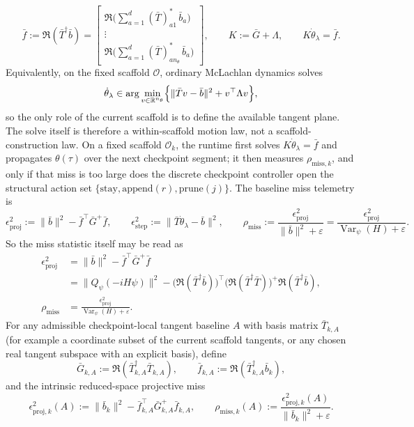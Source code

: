 \documentclass[11pt]{article}
\begin{document}
\[
\bar f
:=
\Re(\bar T^\dagger\bar b)
=
\left[
\begin{array}{c}
\Re\!\bigl(\sum_{a=1}^{d}(\bar T)_{a1}^*\,\bar b_a\bigr)\\
\vdots\\
\Re\!\bigl(\sum_{a=1}^{d}(\bar T)_{a n_\theta}^*\,\bar b_a\bigr)
\end{array}
\right],
\qquad
K:=\bar G+\Lambda,
\qquad
K\dot\theta_\lambda=\bar f.
\]
Equivalently, on the fixed scaffold \(\mathcal O\), ordinary McLachlan dynamics solves
\[
\dot\theta_\lambda\in\arg\min_{v\in\mathbb R^{n_\theta}}
\Bigl\{
\|\bar T v-\bar b\|^2+v^\top\Lambda v
\Bigr\},
\]
so the only role of the current scaffold is to define the available tangent plane. The solve itself is therefore a within-scaffold motion law, not a scaffold-construction law.
On a fixed scaffold \(\mathcal O_k\), the runtime first solves \(K\dot\theta_\lambda=\bar f\) and propagates \(\theta(\tau)\) over the next checkpoint segment; it then measures \(\rho_{\mathrm{miss},k}\), and only if that miss is too large does the discrete checkpoint controller open the structural action set \(\{\mathrm{stay},\mathrm{append}(r),\mathrm{prune}(j)\}\).
The baseline miss telemetry is
\[
\epsilon_{\mathrm{proj}}^2:=\|\bar b\|^2-\bar f^\top\bar G^+\bar f,
\qquad
\epsilon_{\mathrm{step}}^2:=\|\bar T\dot\theta_\lambda-\bar b\|^2,
\qquad
\rho_{\mathrm{miss}}:=\frac{\epsilon_{\mathrm{proj}}^2}{\|\bar b\|^2+\varepsilon}
=\frac{\epsilon_{\mathrm{proj}}^2}{\operatorname{Var}_\psi(H)+\varepsilon}.
\]
So the miss statistic itself may be read as
\[
\begin{aligned}
\epsilon_{\mathrm{proj}}^2
&=
\|\bar b\|^2-\bar f^\top\bar G^+\bar f\\
&=
\|Q_\psi(-iH\psi)\|^2
-
\bigl(\Re(\bar T^\dagger\bar b)\bigr)^\top
\bigl(\Re(\bar T^\dagger\bar T)\bigr)^+
\Re(\bar T^\dagger\bar b),\\
\rho_{\mathrm{miss}}
&=
\frac{\epsilon_{\mathrm{proj}}^2}{\operatorname{Var}_\psi(H)+\varepsilon}.
\end{aligned}
\]
For any admissible checkpoint-local tangent baseline \(A\) with basis matrix \(\bar T_{k,A}\) (for example a coordinate subset of the current scaffold tangents, or any chosen real tangent subspace with an explicit basis), define
\[
\bar G_{k,A}:=\Re(\bar T_{k,A}^\dagger \bar T_{k,A}),
\qquad
\bar f_{k,A}:=\Re(\bar T_{k,A}^\dagger \bar b_k),
\]
and the intrinsic reduced-space projective miss
\[
\epsilon_{\mathrm{proj},k}^2(A)
:=
\|\bar b_k\|^2-\bar f_{k,A}^\top \bar G_{k,A}^+\bar f_{k,A},
\qquad
\rho_{\mathrm{miss},k}(A)
:=
\frac{\epsilon_{\mathrm{proj},k}^2(A)}{\|\bar b_k\|^2+\varepsilon}.
\]
\end{document}
